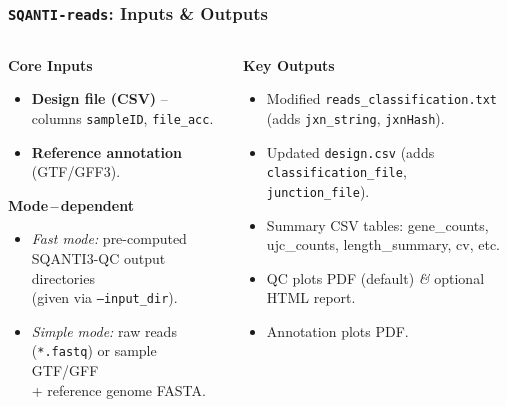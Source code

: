 \documentclass[aspectratio=169]{beamer}
\begin{document}
\begin{frame}
  \frametitle{\texttt{SQANTI-reads}: Inputs \& Outputs}
  \begin{columns}[T]
    \begin{column}{0.48\textwidth}
      \textbf{Core Inputs}
      \begin{itemize}
        \item \textbf{Design file (CSV)} – columns \texttt{sampleID}, \texttt{file\_acc}.
        \item \textbf{Reference annotation} (GTF/GFF3).
      \end{itemize}
      \vspace{0.3em}
      \textbf{Mode\,–\,dependent}
      \begin{itemize}
        \item \emph{Fast mode:} pre-computed SQANTI3-QC output directories\\(given via \texttt{--input\_dir}).
        \item \emph{Simple mode:} raw reads (\texttt{*.fastq}) or sample GTF/GFF\\\phantom{---}+ reference genome FASTA.
      \end{itemize}
      \vspace{0.3em}
    \end{column}
    \begin{column}{0.48\textwidth}
      \textbf{Key Outputs}
      \begin{itemize}
        \item Modified \texttt{reads\_classification.txt} (adds \texttt{jxn\_string}, \texttt{jxnHash}).
        \item Updated \texttt{design.csv} (adds \texttt{classification\_file}, \texttt{junction\_file}).
        \item Summary CSV tables: gene\_counts, ujc\_counts, length\_summary, cv, etc.
        \item QC plots PDF (default) \emph{\&} optional HTML report.
        \item Annotation plots PDF.
      \end{itemize}
      \vspace{0.3em}
    \end{column}
  \end{columns}
  \vspace{0.15cm}
\end{frame}
\end{document}
